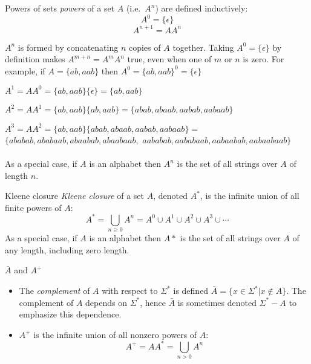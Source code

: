 \documentclass[style=sailor,size=12pt]{powerdot}
\begin{document}
\begin{wideslide}[bm=,toc=]{Powers of sets}
\emph{powers} of a set $A$ (i.e.\ $A^n$) are defined inductively:
\[
  A^0 = \{\epsilon\}
\]
\[
  A^{n+1} = AA^n
\]

$A^n$ is formed by concatenating $n$ copies of $A$ together. Taking $A^0 =
\{\epsilon\}$ by definition makes $A^{m+n} = A^mA^n$ true, even when one of $m$
or $n$ is zero. For example, if $A = \{ab,aab\}$ then
$A^0 = \{ab,aab\}^0 = \{\epsilon\}$

$A^1 = AA^0 = \{ab,aab\}\{\epsilon\} = \{ab,aab\}$

$A^2 = AA^1 = \{ab,aab\}\{ab,aab\} = \{abab,abaab,aabab,aabaab\}$

$A^3 = AA^2 = \{ab,aab\}\{abab,abaab,aabab,aabaab\} =$
$\{ababab,ababaab,abaabab,abaabaab, $
$aababab,aababaab,aabaabab,aabaabaab \}$
\\~\\
As a special case, if $A$ is an alphabet then $A^n$ is the set of all strings
over $A$ of length $n$.
\end{wideslide}

\begin{slide}[bm=,toc=]{Kleene closure}
\emph{Kleene closure} of a set $A$, denoted $A^*$, is the infinite union of all
finite powers of $A$:
\[
A^* = \bigcup_{n \geq 0} A^n = A^0 \cup A^1 \cup A^2 \cup A^3 \cup \cdots
\]
As a special case, if $A$ is an alphabet then $A*$ is the set of all strings
over $A$ of any length, including zero length.
\end{slide}

\begin{slide}[bm=,toc=]{$\bar{A}$ and $A^+$}
\begin{itemize}
   \item The \emph{complement} of $A$ with respect to $\Sigma^*$ is defined 
         $\bar{A} = \{x \in \Sigma^* | x \notin A\}$. The complement of $A$
         depends on $\Sigma^*$, hence $\bar{A}$ is sometimes denoted 
         $\Sigma^* - A$ to emphasize this dependence.
   \item $A^+$ is the infinite union of all nonzero powers of $A$:
         \[
           A^+ = AA^* = \bigcup_{n>0} A^n
           \]
\end{itemize}
\end{slide}
\end{document}
